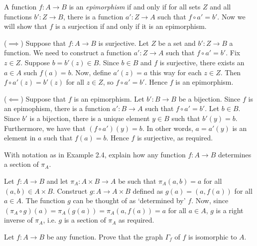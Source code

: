 \documentclass[12pt,letterpaper,boxed]{hmcpset}
\begin{document}
\begin{solution}
	A function $f:A\to B$ is an \textit{epimorphism} if and only if for all sets $Z$
	and all functions $b':Z\to B$, there is a function $a':Z\to A$ such that $f\circ
	a' = b'$. Now we will show that $f$ is a surjection if and only if it is an
	epimorphism.
	
	($\implies$) Suppose that $f:A\to B$ is surjective. Let $Z$ be a set and
	$b':Z\to B$ a function. We need to construct a function $a':Z\to A$ such that
	$f\circ a' = b'$. Fix $z\in Z$. Suppose $b=b'(z)\in B$. Since $b\in B$ and $f$
	is surjective, there exists an $a\in A$ such $f(a) = b$. Now, define $a'(z) =
	a$ this way for each $z\in Z$. Then $f\circ a'(z) = b'(z)$ for all $z\in Z$, so
	$f\circ a' = b'$. Hence $f$ is an epimorphism.
	
	($\impliedby$) Suppose that $f$ is an epimorphism. Let $b':B\to B$ be a
	bijection. Since $f$ is an epimophism, there is a function $a':B\to A$ such that
	$f\circ a' = b'$. Let $b\in B$. Since $b'$ is a bijection, there is a unique
	element $y\in B$ such that $b'(y) = b$. Furthermore, we have that $(f\circ
	a')(y) = b$. In other words, $a = a'(y)$ is an element in $a$ such that $f(a) =
	b$. Hence $f$ is surjective, as required.
\end{solution}


\begin{problem}[2.6]
	With notation as in Example 2.4, explain how any function $f:A\to B$ determines
	a section of $\pi_A$.
\end{problem}

\begin{solution}
	Let $f:A\to B$ and let $\pi_A:A\times B\to A$ be such that $\pi_A(a,b) = a$ for
	all $(a,b)\in A\times B$. Construct $g:A\to A\times B$ defined as $g(a) = (a,
	f(a))$ for all $a\in A$. The function $g$ can be thought of as `determined by'
	$f$. Now, since $(\pi_A\circ g)(a) = \pi_A(g(a)) = \pi_A(a, f(a)) = a$ for all
	$a\in A$, $g$ is a right inverse of $\pi_A$, i.e. $g$ is a section of $\pi_A$ as
	required.
\end{solution}


\begin{problem}[2.7]
	Let $f:A\to B$ be any function. Prove that the graph $\Gamma_f$ of $f$ is
	isomorphic to $A$.
\end{problem}
\end{document}
